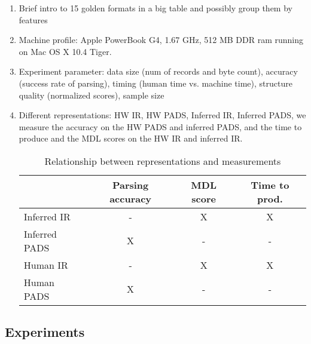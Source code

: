 \begin{enumerate}
\item Brief intro to 15 golden formats in a big table and possibly group them by
features

\item Machine profile: Apple PowerBook G4, 1.67 GHz, 512 MB DDR ram running on 
Mac OS X 10.4 Tiger. 

\item Experiment parameter: data size (num of records and byte count), accuracy (success rate of parsing), 
timing (human time vs. machine time), structure quality (normalized scores), sample size

\item Different representations: HW IR, HW PADS, Inferred IR, Inferred PADS, we measure
the accuracy on the HW PADS and inferred PADS, and the time to produce and the MDL scores on
the HW IR and inferred IR.

\begin{table}
\begin{center}
\begin{tabular}{|l|c|c|c|} \hline
		& Parsing accuracy 	& MDL score 	&  Time to prod.\\ \hline
Inferred IR 	& -			& X		& X	\\ \hline
Inferred PADS	& X			& -		& -	\\ \hline 
Human IR	& -			& X		& X	\\ \hline	
Human PADS	& X			& -		& -	\\ \hline	
\end{tabular}
\caption{Relationship between representations and measurements}
\end{center}
\end{table}

\end{enumerate}

\subsection{Experiments}

